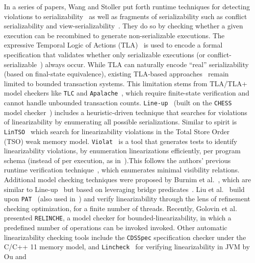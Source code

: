 In a series of papers, Wang and Stoller put forth runtime techniques for 
detecting violations to serializability~\cite{WaSt06a} as well as fragments of 
serializability such 
as conflict serializability and view-serializability~\cite{WaSt06b}. They do so 
by  checking whether a given execution can be recombined to generate 
non-serializable executions.
%
The expressive Temporal Logic of Actions (TLA)~\cite{La94} is used to encode a 
formal specification that validates whether only serializable executions (or 
conflict-serializable~\cite{CoOlPnTuZu07}) always occur. 
While TLA can naturally encode ``real'' serializability (based on final-state 
equivalence), existing TLA-based approaches~\cite{SoVaVi20, Ho24} remain 
limited to bounded transaction systems. This limitation stems from TLA/TLA+ 
model checkers like \texttt{TLC} and \texttt{Apalache}~\cite{YuMaLa99, 
KoKuTr19}, which require 
finite-state verification and cannot handle unbounded transaction counts.
%
\texttt{Line-up}~\cite{BuDeMuTa10} (built on the \texttt{CHESS} model 
checker~\cite{MuQaBaBaNaNe08}) includes a heuristic-driven technique that 
searches for violations of linearizability by enumerating all possible 
serializations. Similar to spirit is \texttt{LinTSO}~\cite{BuGoMuYa12} which 
search for 
linearizability violations in the Total Store
Order (TSO) weak memory model.
%
\texttt{Violat}~\cite{EmEn19} is a tool that generates tests to identify 
linearizability violations, by 
enumeration linearizations efficiently, per program schema (instead of per 
execution, as in~\cite{BuDeMuTa10}).This follows the authors' previous runtime verification technique~\cite{EmEn18}, which enumerates minimal visibility relations.
%
Additional model checking techniques were proposed by Burnim et 
al.~\cite{BuNeSe11}, which are similar to Line-up~\cite{BuDeMuTa10} but based 
on leveraging bridge predicates~\cite{BuSe09}. 
%
Liu et al.~\cite{LiChLiSuZhDo12} build upon \texttt{PAT}~\cite{SuLuDoPa09} 
(also used 
in~\cite{LiChLiSu09, Zh11}) and verify linearizability through the lens of 
refinement checking optimization, for a finite number of threads.
%
%
Recently, Golovin et al.~\cite{GoKoVa25} presented \texttt{RELINCHE}, a model 
checker for bounded-linearizability, in which a predefined number of operations 
can be invoked invoked.
%
Other automatic linearizability checking tools include the \texttt{CDSSpec} 
specification checker under the C/C++ 11 memory model, and 
\texttt{Lincheck}~\cite{KoDeSoTsAl23} for verifying linearizability in JVM by 
Ou and 
